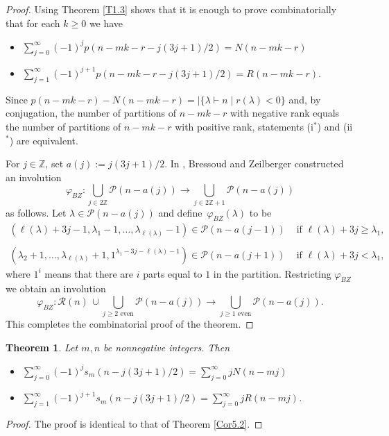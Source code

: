 \documentclass{amsart}
\newtheorem{theorem}{Theorem}[section]
\theoremstyle{definition}
\begin{document}
\begin{proof}Using Theorem \ref{T1.3} shows that it is enough to prove combinatorially that for each $k\geq 0$ we have 

\begin{itemize}\item[(i$^*$)] $\displaystyle \sum_{j=0}^\infty (-1)^{j} p(n-mk-r-j(3j+1)/2)= N(n-mk-r)$
\item[(ii$^*$)] $\displaystyle \sum_{j=1}^\infty (-1)^{j+1} p(n-mk-r-j(3j+1)/2)= R(n-mk-r)$.
\end{itemize}
Since $p(n-mk-r)-N(n-mk-r)=|\{\lambda\vdash n \mid r(\lambda)<0\}$ and, by conjugation, the number of partitions of $n-mk-r$ with negative rank equals the number of partitions of $n-mk-r$ with positive rank, statements (i$^*$) and (ii$^*$) are equivalent. 

For $j \in \mathbb Z$, set $a(j):=j(3j+1)/2$.  In \cite{BZ85}, Bressoud and Zeilberger constructed an involution $$\varphi_{BZ}: \bigcup_{j\in 2\mathbb Z}\mathcal P\left(n-a(j)\right)\to  \bigcup_{j\in 2\mathbb Z+1}\mathcal P\left(n-a(j)\right)$$ as follows. Let $\lambda \in \mathcal P(n-a(j))$ and define\ $\varphi_{BZ}(\lambda)$ to be 
\begin{align*}(\ell(\lambda)+3j-1, \lambda_1-1, \ldots, \lambda_{\ell(\lambda)}-1)\in \mathcal P(n-a(j-1)) & \text{ if } \ell(\lambda)+3j\geq \lambda_1, \\ \ \\  (\lambda_2+1,\ldots, \lambda_{\ell(\lambda)}+1, 1^{\lambda_1-3j-\ell(\lambda) -1})\in \mathcal P(n-a(j+1))  & \text{ if } \ell(\lambda)+3j< \lambda_1,\end{align*} where $1^i$ means that there  are $i$ parts equal to $1$ in the partition. 
 Restricting $\varphi_{BZ}$ we obtain an involution $$\varphi_{BZ}: \mathcal R(n)\, \cup \bigcup_{j\geq 2 \text{ even}}\mathcal P\left(n-a(j)\right)\to  \bigcup_{j\geq 1 \text{ even}}\mathcal P\left(n-a(j)\right).$$ This completes the combinatorial proof of the theorem. 
 \end{proof}

\begin{theorem}{\cite[Corollary 5.3]{M23}} \label{Cor5.3} Let $m,n$  be nonnegative integers. Then 
\begin{itemize}\item[(i)] $\displaystyle \sum_{j=0}^\infty (-1)^{j} s_{m}(n-j(3j+1)/2)= \sum_{j=0}^\infty jN(n-mj)$
\item[(ii)] $\displaystyle \sum_{j=1}^\infty (-1)^{j+1} s_{m}(n-j(3j+1)/2)= \sum_{j=0}^\infty jR(n-mj)$.
\end{itemize}
\end{theorem}
\begin{proof} The proof is identical to that of Theorem \ref{Cor5.2}.
\end{proof}
\end{document}
